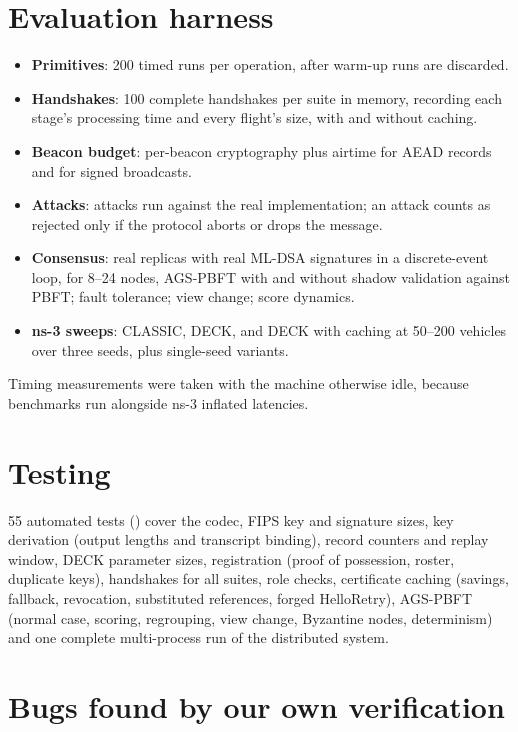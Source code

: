 \section{Evaluation harness}

\begin{itemize}
\item \textbf{Primitives}: 200 timed runs per operation, after warm-up runs
are discarded.
\item \textbf{Handshakes}: 100 complete handshakes per suite in memory,
recording each stage's processing time and every flight's size, with and
without caching.
\item \textbf{Beacon budget}: per-beacon cryptography plus airtime for AEAD
records and for signed broadcasts.
\item \textbf{Attacks}:  attacks run against the real
implementation; an attack counts as rejected only if the protocol aborts or
drops the message.
\item \textbf{Consensus}: real replicas with real ML-DSA signatures in a
discrete-event loop, for 8--24 nodes, AGS-PBFT with and without shadow
validation against PBFT; fault tolerance; view change; score dynamics.
\item \textbf{ns-3 sweeps}: CLASSIC, DECK, and DECK with caching at 50--200
vehicles over three seeds, plus single-seed variants.
\end{itemize}
Timing measurements were taken with the machine otherwise idle, because
benchmarks run alongside ns-3 inflated latencies.

\section{Testing}

55 automated tests () cover the codec, FIPS key and signature sizes, key derivation (output lengths and transcript binding), record
counters and replay window, DECK parameter sizes, registration (proof of
possession, roster, duplicate keys), handshakes for all suites, role checks,
certificate caching (savings, fallback, revocation, substituted references,
forged HelloRetry), AGS-PBFT (normal case, scoring, regrouping, view change,
Byzantine nodes, determinism) and one complete multi-process run of the
distributed system.

\section{Bugs found by our own verification}

